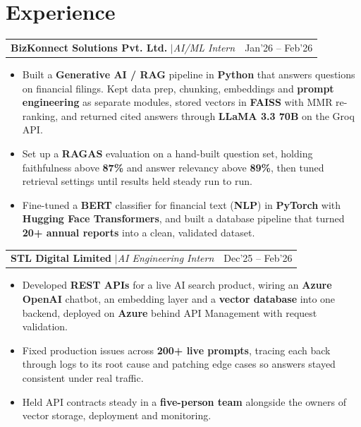 \documentclass[a4paper,10pt]{article}
\makeatletter
\newcommand{\entrygap}{\vspace{5pt}}
\newcommand{\sep}{\unskip\hspace{0.5em}$|$\hspace{0.5em}\ignorespaces}
\newcommand{\entry}[2]{%
  \begin{tabularx}{\linewidth}{@{}Xr@{}}#1 & #2\end{tabularx}\par}
\makeatother
\begin{document}

\section*{Experience}

\entry{\textbf{BizKonnect Solutions Pvt. Ltd.} \sep \textit{AI/ML Intern}}{Jan'26 -- Feb'26}
\begin{itemize}
    \item Built a \textbf{Generative AI / RAG} pipeline in \textbf{Python} that answers questions on financial filings. Kept data prep, chunking, embeddings and \textbf{prompt engineering} as separate modules, stored vectors in \textbf{FAISS} with MMR re-ranking, and returned cited answers through \textbf{LLaMA 3.3 70B} on the Groq API.
    \item Set up a \textbf{RAGAS} evaluation on a hand-built question set, holding faithfulness above \textbf{87\%} and answer relevancy above \textbf{89\%}, then tuned retrieval settings until results held steady run to run.
    \item Fine-tuned a \textbf{BERT} classifier for financial text (\textbf{NLP}) in \textbf{PyTorch} with \textbf{Hugging Face Transformers}, and built a database pipeline that turned \textbf{20+ annual reports} into a clean, validated dataset.
\end{itemize}
\entrygap
\entry{\textbf{STL Digital Limited} \sep \textit{AI Engineering Intern}}{Dec'25 -- Feb'26}
\begin{itemize}
    \item Developed \textbf{REST APIs} for a live AI search product, wiring an \textbf{Azure OpenAI} chatbot, an embedding layer and a \textbf{vector database} into one backend, deployed on \textbf{Azure} behind API Management with request validation.
    \item Fixed production issues across \textbf{200+ live prompts}, tracing each back through logs to its root cause and patching edge cases so answers stayed consistent under real traffic.
    \item Held API contracts steady in a \textbf{five-person team} alongside the owners of vector storage, deployment and monitoring.
\end{itemize}

\end{document}
